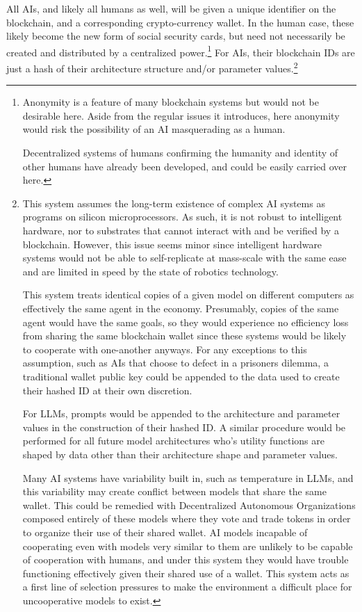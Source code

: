 \documentclass{article}[10pt]
\begin{document}
All AIs, and likely all humans as well, will be given a unique identifier on the blockchain, and a corresponding crypto-currency wallet. 
In the human case, these likely become the new form of social security cards, but need not necessarily be created and distributed by a centralized power.\footnote{
    Anonymity is a feature of many blockchain systems but would not be desirable here.
    Aside from the regular issues it introduces, here anonymity would risk the possibility of an AI masquerading as a human.\par\vspace{0.05in}
    Decentralized systems of humans confirming the humanity and identity of other humans have already been developed, and could be easily carried over here.
}
For AIs, their blockchain IDs are just a hash of their architecture structure and/or parameter values.\footnote{
    This system assumes the long-term existence of complex AI systems as programs on silicon microprocessors.
    As such, it is not robust to intelligent hardware, nor to substrates that cannot interact with and be verified by a blockchain.
    However, this issue seems minor since intelligent hardware systems would not be able to self-replicate at mass-scale with the same ease and are limited in speed by the state of robotics technology.\par 
    \vspace{0.05in}
    This system treats identical copies of a given model on different computers as effectively the same agent in the economy.
    Presumably, copies of the same agent would have the same goals, so they would experience no efficiency loss from sharing the same blockchain wallet since these systems would be likely to cooperate with one-another anyways.
    For any exceptions to this assumption, such as AIs that choose to defect in a prisoners dilemma, a traditional wallet public key could be appended to the data used to create their hashed ID at their own discretion.\par \vspace{0.05in}
    For LLMs, prompts would be appended to the architecture and parameter values in the construction of their hashed ID.
    A similar procedure would be performed for all future model architectures who's utility functions are shaped by data other than their architecture shape and parameter values.\par
    \vspace{0.05in}
    Many AI systems have variability built in, such as temperature in LLMs, and this variability may create conflict between models that share the same wallet.
    This could be remedied with Decentralized Autonomous Organizations composed entirely of these models where they vote and trade tokens in order to organize their use of their shared wallet.
    AI models incapable of cooperating even with models very similar to them are unlikely to be capable of cooperation with humans, and under this system they would have trouble functioning effectively given their shared use of a wallet.
    This system acts as a first line of selection pressures to make the environment a difficult place for uncooperative models to exist.
}
\end{document}
